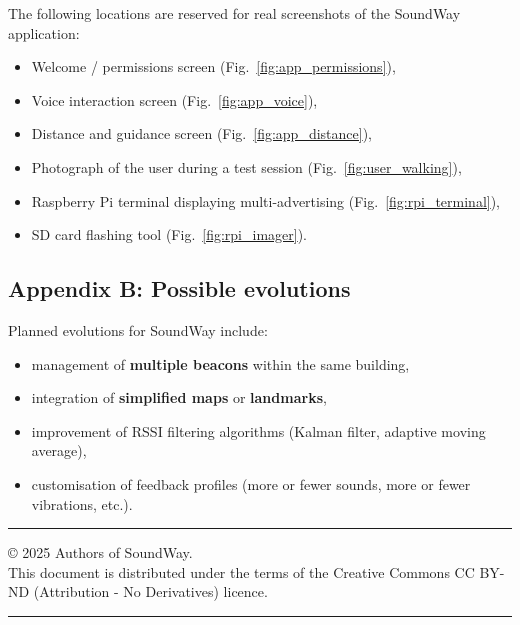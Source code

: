 \documentclass[12pt,a4paper]{article}
\begin{document}
The following locations are reserved for real screenshots of the SoundWay application:

\begin{itemize}
    \item Welcome / permissions screen (Fig.~\ref{fig:app_permissions}),
    \item Voice interaction screen (Fig.~\ref{fig:app_voice}),
    \item Distance and guidance screen (Fig.~\ref{fig:app_distance}),
    \item Photograph of the user during a test session (Fig.~\ref{fig:user_walking}),
    \item Raspberry Pi terminal displaying multi-advertising (Fig.~\ref{fig:rpi_terminal}),
    \item SD card flashing tool (Fig.~\ref{fig:rpi_imager}).
\end{itemize}

\subsection{Appendix B: Possible evolutions}

Planned evolutions for SoundWay include:
\begin{itemize}
    \item management of \textbf{multiple beacons} within the same building,
    \item integration of \textbf{simplified maps} or \textbf{landmarks},
    \item improvement of RSSI filtering algorithms (Kalman filter, adaptive moving average),
    \item customisation of feedback profiles (more or fewer sounds, more or fewer vibrations, etc.).
\end{itemize}

\bigskip
\hrule
\bigskip

{\small \noindent © 2025 Authors of SoundWay.\\
    This document is distributed under the terms of the Creative Commons CC BY-ND (Attribution - No Derivatives) licence. \doclicenseThis}

\bigskip
\hrule

\printindex
\end{document}
